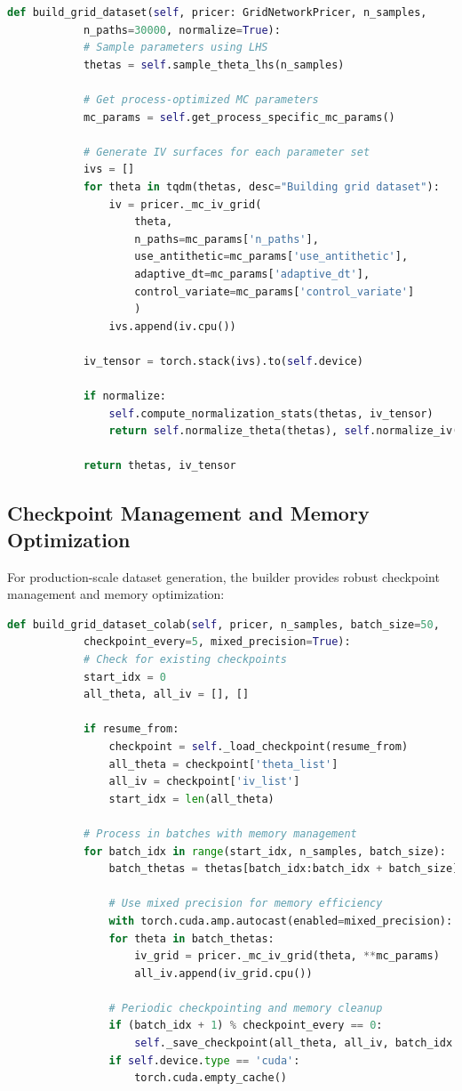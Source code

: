 	\begin{lstlisting}[language=Python, basicstyle=\ttfamily\footnotesize, 
		frame=single, rulecolor=\color{black!20}, backgroundcolor=\color{gray!5},
		showstringspaces=false, breaklines=true, columns=fullflexible]
		def build_grid_dataset(self, pricer: GridNetworkPricer, n_samples, 
			n_paths=30000, normalize=True):
			# Sample parameters using LHS
			thetas = self.sample_theta_lhs(n_samples)
		
			# Get process-optimized MC parameters
			mc_params = self.get_process_specific_mc_params()
		
			# Generate IV surfaces for each parameter set
			ivs = []
			for theta in tqdm(thetas, desc="Building grid dataset"):
				iv = pricer._mc_iv_grid(
					theta, 
					n_paths=mc_params['n_paths'],
					use_antithetic=mc_params['use_antithetic'],
					adaptive_dt=mc_params['adaptive_dt'],
					control_variate=mc_params['control_variate']
					)
				ivs.append(iv.cpu())
		
			iv_tensor = torch.stack(ivs).to(self.device)
		
			if normalize:
				self.compute_normalization_stats(thetas, iv_tensor)
				return self.normalize_theta(thetas), self.normalize_iv(iv_tensor)
		
			return thetas, iv_tensor
	\end{lstlisting}
	
	\subsection{Checkpoint Management and Memory Optimization}
	
	For production-scale dataset generation, the builder provides robust checkpoint management and memory optimization:
	
	\begin{lstlisting}[language=Python, basicstyle=\ttfamily\footnotesize, 
		frame=single, rulecolor=\color{black!20}, backgroundcolor=\color{gray!5},
		showstringspaces=false, breaklines=true, columns=fullflexible]
		def build_grid_dataset_colab(self, pricer, n_samples, batch_size=50,
			checkpoint_every=5, mixed_precision=True):
			# Check for existing checkpoints
			start_idx = 0
			all_theta, all_iv = [], []
		
			if resume_from:
				checkpoint = self._load_checkpoint(resume_from)
				all_theta = checkpoint['theta_list']
				all_iv = checkpoint['iv_list']
				start_idx = len(all_theta)
		
			# Process in batches with memory management
			for batch_idx in range(start_idx, n_samples, batch_size):
				batch_thetas = thetas[batch_idx:batch_idx + batch_size]
		
				# Use mixed precision for memory efficiency
				with torch.cuda.amp.autocast(enabled=mixed_precision):
				for theta in batch_thetas:
					iv_grid = pricer._mc_iv_grid(theta, **mc_params)
					all_iv.append(iv_grid.cpu())
		
				# Periodic checkpointing and memory cleanup
				if (batch_idx + 1) % checkpoint_every == 0:
					self._save_checkpoint(all_theta, all_iv, batch_idx + 1)
				if self.device.type == 'cuda':
					torch.cuda.empty_cache()
	\end{lstlisting}
	
